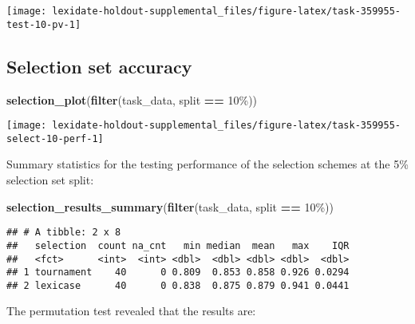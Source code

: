 \documentclass[
]{book}
\newenvironment{Shaded}{\begin{snugshade}}{\end{snugshade}}
\newcommand{\FunctionTok}[1]{\textcolor[rgb]{0.13,0.29,0.53}{\textbf{#1}}}
\newcommand{\NormalTok}[1]{#1}
\newcommand{\SpecialCharTok}[1]{\textcolor[rgb]{0.81,0.36,0.00}{\textbf{#1}}}
\newcommand{\StringTok}[1]{\textcolor[rgb]{0.31,0.60,0.02}{#1}}
\begin{document}
\texttt{[image: lexidate-holdout-supplemental\_files/figure-latex/task-359955-test-10-pv-1]}

\hypertarget{selection-set-accuracy-11}{%
\subsection{Selection set accuracy}\label{selection-set-accuracy-11}}

\begin{Shaded}
\begin{Highlighting}[]
\FunctionTok{selection\_plot}\NormalTok{(}\FunctionTok{filter}\NormalTok{(task\_data, split }\SpecialCharTok{==} \StringTok{\textquotesingle{}10\%\textquotesingle{}}\NormalTok{))}
\end{Highlighting}
\end{Shaded}

\texttt{[image: lexidate-holdout-supplemental\_files/figure-latex/task-359955-select-10-perf-1]}

Summary statistics for the testing performance of the selection schemes at the 5\% selection set split:

\begin{Shaded}
\begin{Highlighting}[]
\FunctionTok{selection\_results\_summary}\NormalTok{(}\FunctionTok{filter}\NormalTok{(task\_data, split }\SpecialCharTok{==} \StringTok{\textquotesingle{}10\%\textquotesingle{}}\NormalTok{))}
\end{Highlighting}
\end{Shaded}

\begin{verbatim}
## # A tibble: 2 x 8
##   selection  count na_cnt   min median  mean   max    IQR
##   <fct>      <int>  <int> <dbl>  <dbl> <dbl> <dbl>  <dbl>
## 1 tournament    40      0 0.809  0.853 0.858 0.926 0.0294
## 2 lexicase      40      0 0.838  0.875 0.879 0.941 0.0441
\end{verbatim}

The permutation test revealed that the results are:
\end{document}
